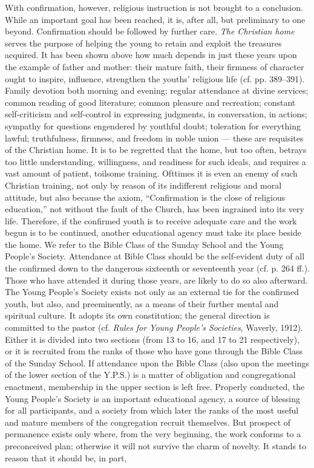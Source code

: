 With confirmation, however, religious instruction is not brought to a conclusion. While an important goal has been reached, it is, after all, but preliminary to one beyond. Confirmation should be followed by further care. \emph{The Christian home} serves the purpose of helping the young to retain and exploit the treasures acquired. It has been shown above how much depends in just these years upon the example of father and mother: their mature faith, their firmness of character ought to inspire, influence, strengthen the youths’ religious life (cf. pp. 389–391). Family devotion both morning and evening; regular attendance at divine services; common reading of good literature; common pleasure and recreation; constant self-criticism and self-control in expressing judgments, in conversation, in actions; sympathy for questions engendered by youthful doubt; toleration for everything lawful; truthfulness, firmness, and freedom in noble union — these are requisites of the Christian home. It is to be regretted that the home, but too often, betrays too little
understanding, willingness, and readiness for such ideals, and requires a vast amount of patient, toilsome training. Ofttimes it is even an enemy of such Christian training, not only by reason of its indifferent religious and moral attitude, but also because the axiom, “Confirmation is the close of religious education,” not without the fault of the Church, has been ingrained into its very life. Therefore, if the confirmed youth is to receive adequate care and the work begun is to be continued, another educational agency must take its place beside the home. We refer to the Bible Class of the Sunday School and the Young People’s Society. Attendance at Bible Class should be the self-evident duty of all the confirmed down to the dangerous sixteenth or seventeenth year (cf. p. 264 ff.). Those who have attended it during those years, are likely to do so also afterward. The Young People’s Society exists not only as an external tie for the confirmed youth, but also, and preeminently, as a means of their further mental and spiritual culture. It adopts its own constitution; the general direction is committed to the pastor (cf. \emph{Rules for Young People’s Societies}, Waverly, 1912). Either it is divided into two sections (from 13 to 16, and 17 to 21 respectively), or it is recruited from the ranks of those who have gone through the Bible Class of the Sunday School. If attendance upon the Bible Class (also upon the meetings of the lower section of the Y.P.S.) is a matter of obligation and congregational enactment, membership in the upper section is left free. Properly conducted, the Young People’s Society is an important educational agency, a source of blessing for all participants, and a society from which later the ranks of the most useful and mature members of the congregation recruit themselves. But prospect of permanence exists only where, from the very beginning, the work conforms to a preconceived plan; otherwise it will not survive the charm of novelty. It stands to reason that it should be, in part,
